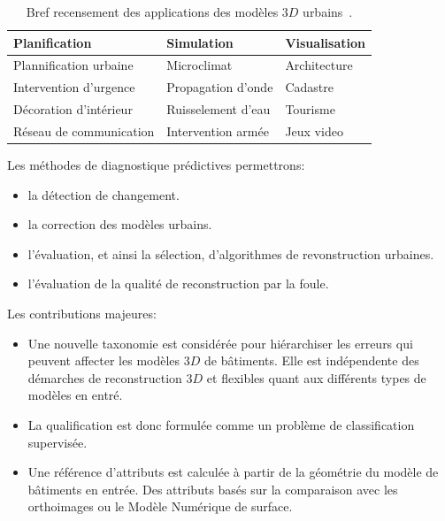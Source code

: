 \documentclass[a4paper,french]{article}
\begin{document}
    \begin{table}[H]
        \begin{center}
            \begin{tabular}{l l l}
                \toprule
                Planification & Simulation & Visualisation \\
                \midrule
                Plannification urbaine & Microclimat & Architecture \\
                Intervention d'urgence & Propagation d'onde
 & Cadastre \\
                Décoration d'intérieur & Ruisselement d'eau & Tourisme \\
                Réseau de communication & Intervention armée & Jeux video \\
                \bottomrule
            \end{tabular}
            \caption{\label{tab::3d_applications} Bref recensement des applications des modèles $3D$ urbains~\cite{Biljecki2015, Scholze2002}.}
        \end{center}
    \end{table}

    Les méthodes de diagnostique prédictives permettrons:
    \begin{itemize}
        \item la détection de changement.
        \item la correction des modèles urbains.
        \item l'évaluation, et ainsi la sélection, d'algorithmes de revonstruction urbaines.
        \item l'évaluation de la qualité de reconstruction par la foule.
    \end{itemize}

    Les contributions majeures:
    \begin{itemize}
        \item Une nouvelle taxonomie est considérée pour hiérarchiser les erreurs qui peuvent affecter les modèles $3D$ de bâtiments. Elle est indépendente des démarches de reconstruction $3D$ et flexibles quant aux différents types de modèles en entré.
        \item La qualification est donc formulée comme un problème de classification supervisée.
        \item Une référence d'attributs est calculée à partir de la géométrie du modèle de bâtiments en entrée. Des attributs basés sur la comparaison avec les orthoimages ou le Modèle Numérique de surface.
    \end{itemize}
\end{document}
